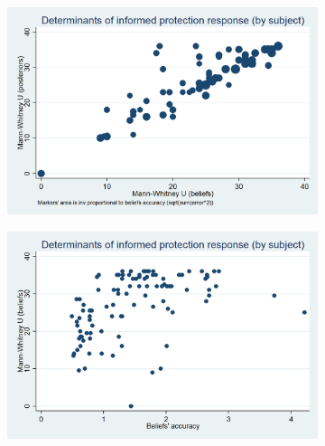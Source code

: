 \documentclass[11pt,a4paper]{article}
\begin{document}
\iffalse
\begin{figure}[!h]
\centering
\caption{Following beliefs vs following posterior probabilities in IP} \label{ref_question}
\begin{subfigure}[t]{.48\textwidth}
  \centering
  \includegraphics[width=\textwidth]{Graphs/clustering.png}
\end{subfigure}
\begin{subfigure}[t]{.48\textwidth}
  \centering
  \includegraphics[width=\textwidth]{Graphs/clustering2.png}
\end{subfigure}
\end{figure}
\end{document}
